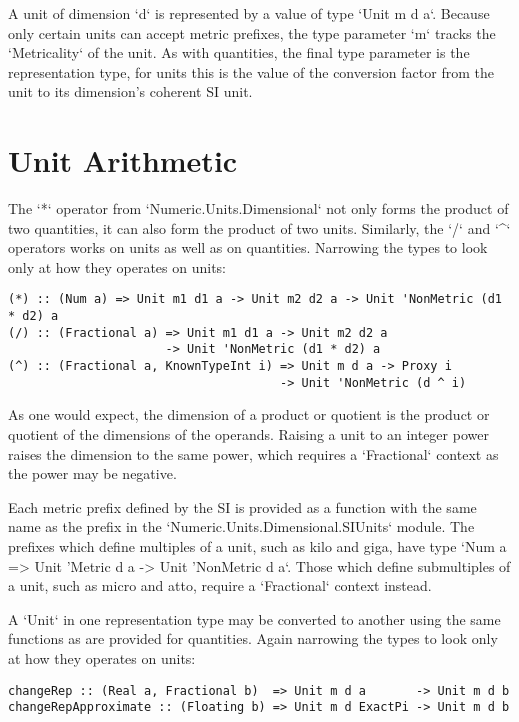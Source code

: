 \documentclass[11pt]{report}
\begin{document}
A unit of dimension `d` is represented by a value of type `Unit m d a`. Because only certain units can
accept metric prefixes, the type parameter `m` tracks the `Metricality` of the unit. As with quantities,
the final type parameter is the representation type, for units this is the value of the conversion factor
from the unit to its dimension's coherent SI unit.

\section{Unit Arithmetic}

The `*` operator from `Numeric.Units.Dimensional` not only forms the product of two quantities, it can also
form the product of two units. Similarly, the `/` and `^` operators works on units as well as on quantities.
Narrowing the types to look only at how they operates on units:

\begin{lstlisting}
(*) :: (Num a) => Unit m1 d1 a -> Unit m2 d2 a -> Unit 'NonMetric (d1 * d2) a
(/) :: (Fractional a) => Unit m1 d1 a -> Unit m2 d2 a
                      -> Unit 'NonMetric (d1 * d2) a
(^) :: (Fractional a, KnownTypeInt i) => Unit m d a -> Proxy i
                                      -> Unit 'NonMetric (d ^ i) 
\end{lstlisting}

As one would expect, the dimension of a product or quotient is the product or quotient of the dimensions of the operands.
Raising a unit to an integer power raises the dimension to the same power, which requires a `Fractional` context as the
power may be negative.

Each metric prefix defined by the SI is provided as a function with the same name as the prefix in the `Numeric.Units.Dimensional.SIUnits` module.
The prefixes which define multiples of a unit, such as kilo and giga, have type `Num a => Unit 'Metric d a -> Unit 'NonMetric d a`.
Those which define submultiples of a unit, such as micro and atto, require a `Fractional` context instead.

A `Unit` in one representation type may be converted to another using the same functions as are provided for quantities.
Again narrowing the types to look only at how they operates on units:

\begin{lstlisting}
changeRep :: (Real a, Fractional b)  => Unit m d a       -> Unit m d b
changeRepApproximate :: (Floating b) => Unit m d ExactPi -> Unit m d b
\end{lstlisting}
\end{document}
